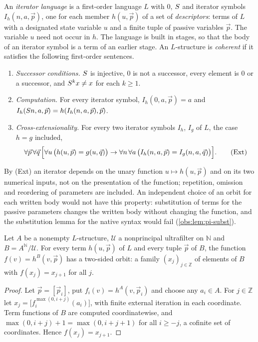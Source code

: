 \begin{definition}
\label{obs:def:pi-coherent}
An \emph{iterator language} is a first-order language $L$ with $0$, $S$ and
iterator symbols $I_h(n,a,\vec p)$, one for each member $h(u,\vec p)$ of a set
of \emph{descriptors}: terms of $L$ with a designated state variable $u$ and a
finite tuple of passive variables $\vec p$. The variable $u$ need not occur in
$h$. The language is built in stages, so that the body of an iterator symbol is
a term of an earlier stage. An $L$-structure is \emph{coherent} if it satisfies
the following first-order sentences.
\begin{enumerate}[label=(\alph*)]
\item \emph{Successor conditions.} $S$ is injective, $0$ is not a successor,
every element is $0$ or a successor, and $S^{k}x\ne x$ for each $k\ge 1$.
\item \emph{Computation.} For every iterator symbol,
$I_h(0,a,\vec p)=a$ and
$I_h(S n,a,\vec p)=h(I_h(n,a,\vec p),\vec p)$.
\item \emph{Cross-extensionality.} For every two iterator symbols $I_h$, $I_g$
of $L$, the case $h=g$ included,
\[
\forall\vec p\,\forall\vec q\,\Bigl[\forall u\,\bigl(h(u,\vec p)=g(u,\vec q)\bigr)\to
\forall n\,\forall a\,\bigl(I_h(n,a,\vec p)=I_g(n,a,\vec q)\bigr)\Bigr].
\tag{Ext}
\]
\end{enumerate}
\end{definition}

By (Ext) an iterator depends on the unary function $u\mapsto h(u,\vec p)$ and
on its two numerical inputs, not on the presentation of the function;
repetition, omission and reordering of parameters are included. An independent
choice of an orbit for each written body would not have this property:
substitution of terms for the passive parameters changes the written body
without changing the function, and the substitution lemma for the native
syntax would fail (\cref{obs:lem:pi-subst}).

\begin{lemma}
\label{obs:lem:pi-orbit}
Let $A$ be a nonempty $L$-structure, $\mathcal{U}$ a nonprincipal ultrafilter
on $\mathbb{N}$ and $B=A^{\mathbb{N}}/\mathcal{U}$. For every term
$h(u,\vec p)$ of $L$ and every tuple $\vec p$ of $B$, the function
$f(v)=h^{B}(v,\vec p)$ has a two-sided orbit: a family $(x_j)_{j\in\mathbb{Z}}$
of elements of $B$ with $f(x_j)=x_{j+1}$ for all $j$.
\end{lemma}

\begin{proof}
Let $\vec p=[\vec p_i]$, put $f_i(v)=h^{A}(v,\vec p_i)$ and choose any
$a_i\in A$. For $j\in\mathbb{Z}$ let
$x_j=\bigl[f_i^{\max(0,i+j)}(a_i)\bigr]$, with finite external iteration in
each coordinate. Term functions of $B$ are computed coordinatewise, and
$\max(0,i+j)+1=\max(0,i+j+1)$ for all $i\ge -j$, a cofinite set of
coordinates. Hence $f(x_j)=x_{j+1}$.
\end{proof}

